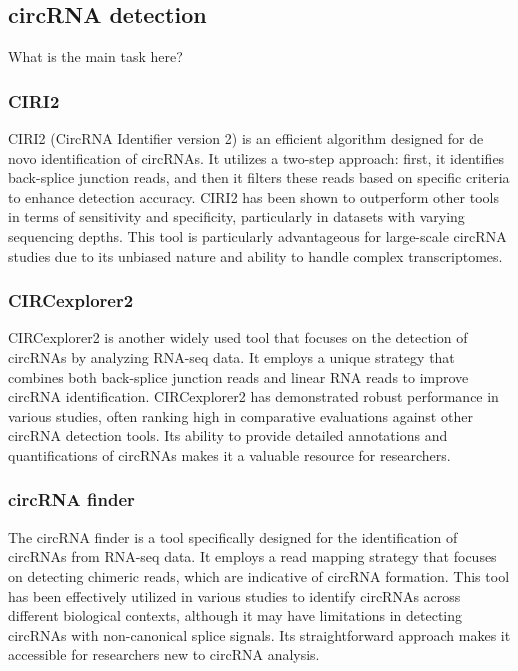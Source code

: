 \subsection{circRNA detection}
\label{subsec:circrna_detection}
What is the main task here?

\subsubsection{CIRI2}
CIRI2 (CircRNA Identifier version 2) is an efficient algorithm designed for de
novo identification of circRNAs.
It utilizes a two-step approach: first, it identifies back-splice junction
reads, and then it filters these reads based on specific criteria to enhance
detection accuracy.
CIRI2 has been shown to outperform other tools in terms of sensitivity and
specificity, particularly in datasets with varying sequencing
depths\supercite{gao_ciri_2015,zheng_reconstruction_2019}.
This tool is particularly advantageous for large-scale circRNA studies due to
its unbiased nature and ability to handle complex
transcriptomes\supercite{chuang_assessing_2023}.

\subsubsection{CIRCexplorer2}
CIRCexplorer2 is another widely used tool that focuses on the detection of
circRNAs by analyzing RNA-seq data.
It employs a unique strategy that combines both back-splice junction reads and
linear RNA reads to improve circRNA identification.
CIRCexplorer2 has demonstrated robust performance in various studies, often
ranking high in comparative evaluations against other circRNA detection
tools\supercite{zeng_comprehensive_2017,nicolet_circular_2018}.
Its ability to provide detailed annotations and quantifications of circRNAs
makes it a valuable resource for researchers\supercite{hansen_comparison_2016}.

\subsubsection{circRNA finder}
The circRNA finder is a tool specifically designed for the identification of
circRNAs from RNA-seq data.
It employs a read mapping strategy that focuses on detecting chimeric reads,
which are indicative of circRNA formation.
This tool has been effectively utilized in various studies to identify circRNAs
across different biological contexts, although it may have limitations in
detecting circRNAs with non-canonical splice
signals\supercite{sekar_circular_2018,liu_prkra_2022}.
Its straightforward approach makes it accessible for researchers new to circRNA
analysis.

